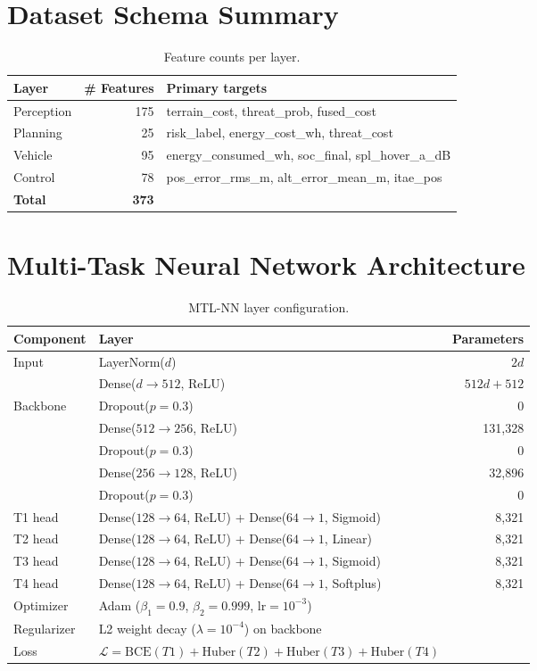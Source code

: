 \documentclass{article}
\begin{document}
\section{Dataset Schema Summary}
\label{app:schema}

\begin{table}[h]
\centering
\caption{Feature counts per layer.}
\begin{tabular}{lrl}
\toprule
Layer & \# Features & Primary targets \\
\midrule
Perception   & 175 & terrain\_cost, threat\_prob, fused\_cost \\
Planning     &  25 & risk\_label, energy\_cost\_wh, threat\_cost \\
Vehicle      &  95 & energy\_consumed\_wh, soc\_final, spl\_hover\_a\_dB \\
Control      &  78 & pos\_error\_rms\_m, alt\_error\_mean\_m, itae\_pos \\
\midrule
\textbf{Total} & \textbf{373} & \\
\bottomrule
\end{tabular}
\end{table}

\section{Multi-Task Neural Network Architecture}
\label{app:nn_arch}

\begin{table}[h]
\centering
\caption{MTL-NN layer configuration.}
\begin{tabular}{llr}
\toprule
Component & Layer & Parameters \\
\midrule
Input       & LayerNorm($d$)              & $2d$ \\
            & Dense($d \to 512$, ReLU)   & $512d + 512$ \\
Backbone    & Dropout($p=0.3$)           & 0 \\
            & Dense($512 \to 256$, ReLU) & 131{,}328 \\
            & Dropout($p=0.3$)           & 0 \\
            & Dense($256 \to 128$, ReLU) & 32{,}896 \\
            & Dropout($p=0.3$)           & 0 \\
\midrule
T1 head & Dense($128 \to 64$, ReLU) + Dense($64 \to 1$, Sigmoid) & 8{,}321 \\
T2 head & Dense($128 \to 64$, ReLU) + Dense($64 \to 1$, Linear)  & 8{,}321 \\
T3 head & Dense($128 \to 64$, ReLU) + Dense($64 \to 1$, Sigmoid) & 8{,}321 \\
T4 head & Dense($128 \to 64$, ReLU) + Dense($64 \to 1$, Softplus)& 8{,}321 \\
\midrule
Optimizer & Adam ($\beta_1{=}0.9$, $\beta_2{=}0.999$, lr$=10^{-3}$) & \\
Regularizer & L2 weight decay ($\lambda{=}10^{-4}$) on backbone & \\
Loss & $\mathcal{L} = \text{BCE}(T1) + \text{Huber}(T2) + \text{Huber}(T3) + \text{Huber}(T4)$ & \\
\bottomrule
\end{tabular}
\end{table}
\end{document}
